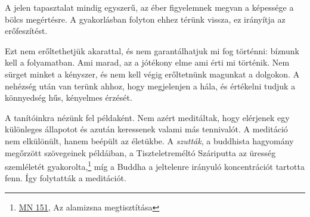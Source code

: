 A jelen tapasztalat mindig egyszerű, az éber figyelemnek megvan a
képessége a bölcs megértésre. A gyakorlásban folyton ehhez térünk
vissza, ez irányítja az erőfeszítést.

Ezt nem erőltethetjük akarattal, és nem garantálhatjuk mi fog történni:
bíznunk kell a folyamatban. Ami marad, az a jótékony elme ami érti mi
történik. Nem sürget minket a kényszer, és nem kell végig erőltetnünk
magunkat a dolgokon. A nehézség után van terünk ahhoz, hogy megjelenjen
a hála, és értékelni tudjuk a könnyedség hűs, kényelmes érzését.


A tanítóinkra nézünk fel példaként. Nem azért meditáltak, hogy elérjenek
egy különleges állapotot és azután keressenek valami más tennivalót. A
meditáció nem elkülönült, hanem beépült az életükbe. A \emph{szutták}, a
buddhista hagyomány megőrzött szövegeinek példáiban, a Tiszteletreméltó
Száriputta az üresség szemléletét gyakorolta,\footnote{\href{https://a-buddha-ujja.hu/mn-151/hu/fenyvesi-robert}{MN
  151}, Az alamizsna megtisztítása} míg a Buddha a jeltelenre irányuló
koncentrációt tartotta fenn. Így folytatták a meditációt.
